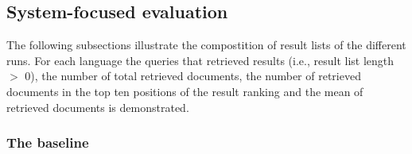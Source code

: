\documentclass[a4paper,11pt]{article}
\begin{document}
\begin{table}[ht]
\caption{Overview of systems, runs and retrieved documents that need to be rated, excluding duplicates. MT = machine translated queries, HT = human translated (i.e., original) queries.}
\label{tab:Runs}
\end{table}


\subsection{System-focused evaluation}
The following subsections illustrate the compostition of result lists of the different runs. For each language the queries that retrieved results (i.e., result list length $>$ 0), the number of total retrieved documents, the number of retrieved documents in the top ten positions of the result ranking and the mean of retrieved documents is demonstrated.

\subsubsection{The baseline}
\end{document}
